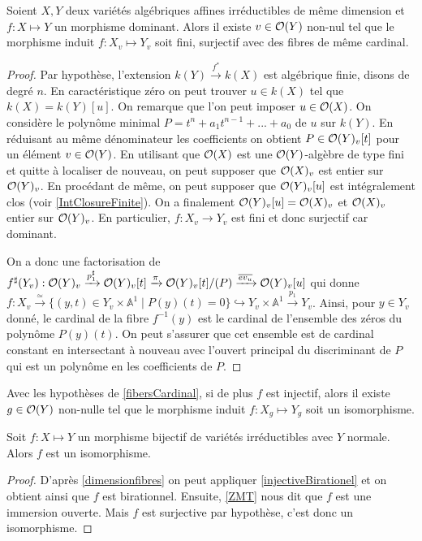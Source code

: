 \begin{prop}\label{fibersCardinal}
Soient $X,Y$ deux variétés algébriques affines irréductibles de même dimension et $f:X \mapsto Y$ un morphisme dominant. Alors il existe $v\in \mathcal{O}(Y)$ non-nul tel que le morphisme induit $f:X_v \mapsto Y_v$ soit fini, surjectif avec des fibres de même cardinal.
\end{prop}
\begin{proof}
Par hypothèse, l'extension $k(Y) \xrightarrow{f^*} k(X)$ est algébrique finie, disons de degré $n$. En caractéristique zéro on peut trouver $u\in k(X)$ tel que $k(X)=k(Y)[u]$. On remarque que l'on peut imposer $u\in \mathcal{O}(X)$. On considère le polynôme minimal $P=t^n+a_1t^{n-1}+...+a_0$ de $u$ sur $k(Y)$. En réduisant au même dénominateur les coefficients on obtient $P\in \mathcal{O}(Y)_v[t]$ pour un élément $v\in \mathcal{O}(Y)$. En utilisant que $\mathcal{O}(X)$ est une $\mathcal{O}(Y)$-algèbre de type fini et quitte à localiser de nouveau, on peut supposer que $\mathcal{O}(X)_v$ est entier sur $\mathcal{O}(Y)_v$. En procédant de même, on peut supposer que $\mathcal{O}(Y)_v[u]$ est intégralement clos (voir \ref{IntClosureFinite}). On a finalement $\mathcal{O}(Y)_v[u]=\mathcal{O}(X)_v$ et $\mathcal{O}(X)_v$ entier sur $\mathcal{O}(Y)_v$. En particulier, $f:X_v \rightarrow Y_v$ est fini et donc surjectif car dominant.

On a donc une factorisation de $f^\sharp(Y_v):\mathcal{O}(Y)_v\xrightarrow{p_1^\sharp}\mathcal{O}(Y)_v[t]\xrightarrow{\pi}\mathcal{O}(Y)_v[t]/(P)\xrightarrow{\overline{ev_u}}\mathcal{O}(Y)_v[u]$ qui donne $f:X_v \xrightarrow{\simeq} \lbrace (y,t) \in Y_v\times \mathbb{A}^1\mid P(y)(t)=0\rbrace \hookrightarrow Y_v\times \mathbb{A}^1 \xrightarrow{p_1} Y_v$. Ainsi, pour $y\in Y_v$ donné, le cardinal de la fibre $f^{-1}(y)$ est le cardinal de l'ensemble des zéros du polynôme $P(y)(t)$. On peut s'assurer que cet ensemble est de cardinal constant en intersectant à nouveau avec l'ouvert principal du discriminant de $P$ qui est un polynôme en les coefficients de $P$.
\end{proof}

\begin{cor}\label{injectiveBirationel}
Avec les hypothèses de \ref{fibersCardinal}, si de plus $f$ est injectif, alors il existe $g\in \mathcal{O}(Y)$ non-nulle tel que le morphisme induit $f:X_g \mapsto Y_g$ soit un isomorphisme.
\end{cor}

\begin{thm}\label{ZMTCor}
Soit $f:X \mapsto Y$ un morphisme bijectif de variétés irréductibles avec $Y$ normale. Alors $f$ est un isomorphisme.
\end{thm}
\begin{proof}
D'après \ref{dimensionfibres} on peut appliquer \ref{injectiveBirationel} et on obtient ainsi que $f$ est birationnel. Ensuite, \ref{ZMT} nous dit que $f$ est une immersion ouverte. Mais $f$ est surjective par hypothèse, c'est donc un isomorphisme.
\end{proof}

